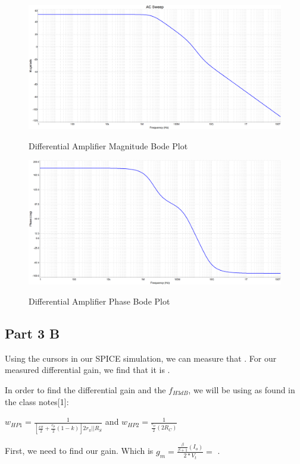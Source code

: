 \documentclass[12pt]{article}
\begin{document}
\begin{figure}[h!]
\centering
\includegraphics[height=0.4\textwidth]{Images/part_3_magnitude_plot.png}\\
\caption{Differential Amplifier Magnitude Bode Plot}
\label{fig:cascadeamp}
\end{figure}

\begin{figure}[h!]
\centering
\includegraphics[height=0.4\textwidth]{Images/part_3_phase.png}\\
\caption{Differential Amplifier Phase Bode Plot}
\label{fig:cascadeamp}
\end{figure}
\FloatBarrier

\subsection{Part 3 B}

Using the cursors in our SPICE simulation, we can measure that . For our measured differential gain, we find that it is .


In order to find the differential gain and the $f_{H3dB}$, we will be using as found in the class notes[1]:
\begin{center}
$w_{HP1}=\frac{1}{[\frac{c\pi}{2}+\frac{c_\mu}{2}(1-k)]2r_\pi||R_S}\nonumber$  and  $w_{HP2}= \frac{1}{\frac{c_\mu}{2}(2R_C)}$
\end{center}
First, we need to find our gain. Which is $g_m = \frac{\frac{\beta}{\beta+1}(I_o)}{2*V_t} =$ .
\end{document}
